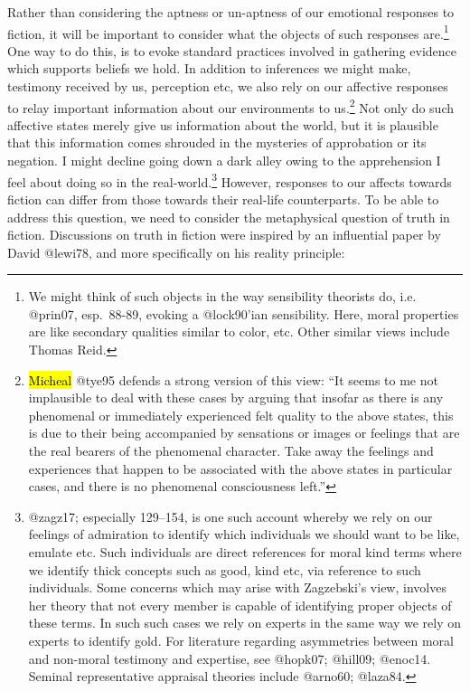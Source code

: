 \documentclass[
  letterpaper,
  DIV=11,
  numbers=noendperiod]{scrartcl}
\theoremstyle{remark}
\begin{document}
Rather than considering the aptness or un-aptness of our emotional
responses to fiction, it will be important to consider what the objects
of such responses are.\footnote{We might think of such objects in the
  way sensibility theorists do, i.e. @prin07, esp.~88-89, evoking a
  @lock90'ian sensibility. Here, moral properties are like secondary
  qualities similar to color, etc. Other similar views include Thomas
  Reid.} One way to do this, is to evoke standard practices involved in
gathering evidence which supports beliefs we hold. In addition to
inferences we might make, testimony received by us, perception etc, we
also rely on our affective responses to relay important information
about our environments to us.\footnote{\hl{Micheal} @tye95 defends a
  strong version of this view: ``It seems to me not implausible to deal
  with these cases by arguing that insofar as there is any phenomenal or
  immediately experienced felt quality to the above states, this is due
  to their being accompanied by sensations or images or feelings that
  are the real bearers of the phenomenal character. Take away the
  feelings and experiences that happen to be associated with the above
  states in particular cases, and there is no phenomenal consciousness
  left.''} Not only do such affective states merely give us information
about the world, but it is plausible that this information comes
shrouded in the mysteries of approbation or its negation. I might
decline going down a dark alley owing to the apprehension I feel about
doing so in the real-world.\footnote{@zagz17; especially 129--154, is
  one such account whereby we rely on our feelings of admiration to
  identify which individuals we should want to be like, emulate etc.
  Such individuals are direct references for moral kind terms where we
  identify thick concepts such as good, kind etc, via reference to such
  individuals. Some concerns which may arise with Zagzebski's view,
  involves her theory that not every member is capable of identifying
  proper objects of these terms. In such such cases we rely on experts
  in the same way we rely on experts to identify gold. For literature
  regarding asymmetries between moral and non-moral testimony and
  expertise, see @hopk07; @hill09; @enoc14. Seminal representative
  appraisal theories include @arno60; @laza84.} However, responses to
our affects towards fiction can differ from those towards their
real-life counterparts. To be able to address this question, we need to
consider the metaphysical question of truth in fiction. Discussions on
truth in fiction were inspired by an influential paper by David @lewi78,
and more specifically on his reality principle:
\end{document}
